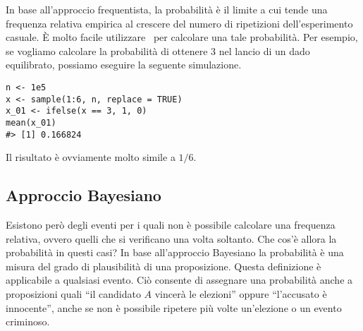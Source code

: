\begin{exmp}
In base all'approccio frequentista, la probabilità è il limite a cui tende una frequenza relativa empirica al crescere del numero di ripetizioni dell'esperimento casuale.
È molto facile utilizzare \R\, per calcolare una tale probabilità.
Per esempio, se vogliamo calcolare la probabilità di ottenere 3 nel lancio di un dado equilibrato, possiamo eseguire la seguente simulazione.
\begin{lstlisting}
n <- 1e5
x <- sample(1:6, n, replace = TRUE)
x_01 <- ifelse(x == 3, 1, 0)
mean(x_01)
#> [1] 0.166824
\end{lstlisting}
Il risultato è ovviamente molto simile a $1/6$.
\end{exmp}


\subsection{Approccio Bayesiano}

%

Esistono però degli eventi per i quali non è possibile calcolare una frequenza relativa, ovvero quelli che si verificano una volta soltanto.
Che cos'è allora la probabilità in questi casi?
In base all'approccio Bayesiano la probabilità è una misura del grado di plausibilità di una proposizione. 
Questa definizione è applicabile a qualsiasi evento. 
Ciò consente di assegnare una probabilità anche a proposizioni quali \enquote{il candidato $A$ vincerà le elezioni} oppure \enquote{l'accusato è innocente}, anche se non è possibile ripetere più volte un'elezione o un evento criminoso.


